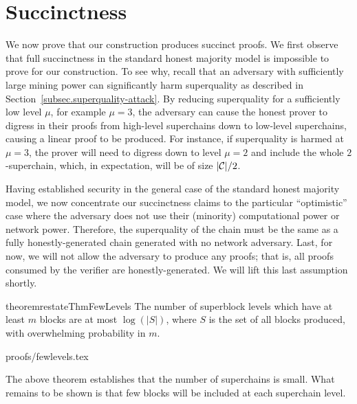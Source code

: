 \section{Succinctness}
\label{sec.succinctness}

We now prove that our construction produces succinct proofs.
%
We first observe that full succinctness in the standard honest majority model is
impossible to prove for our construction. To see why, recall that an adversary
with sufficiently large mining power can significantly harm superquality as
described in %
Section~\ref{subsec.superquality-attack}. By reducing
 superquality for a sufficiently low level $\mu$, for example $\mu = 3$, the
adversary can cause the honest prover to digress in their proofs from high-level
superchains down to low-level superchains, causing a linear proof to be
produced.
For instance, if superquality is harmed at $\mu = 3$, the prover will
need to digress down to level $\mu = 2$ and include the whole $2$-superchain,
which, in expectation, will be of size $|\mathcal{C}|/2$.

Having established security in the general case of the standard honest majority
model, we now concentrate our succinctness claims to the particular
``optimistic'' case where the adversary does not use their (minority)
computational power or network power. Therefore, the superquality of the chain
must be the same as a fully honestly-generated chain generated with no network
adversary. Last, for now, we will not allow the adversary to produce any proofs;
that is, all proofs consumed by the verifier are honestly-generated. We will
lift this last assumption shortly.

\begin{restatable}{theorem}{restateThmFewLevels}
    \label{thm.few-levels}
    The number of superblock levels which have at least $m$ blocks are at most
    $\log(|S|)$, where $S$ is the set of all blocks produced, with overwhelming
    probability in $m$.
\end{restatable}

{proofs/fewlevels.tex}

The above theorem establishes that the number of superchains is small. What
remains to be shown is that few blocks will be included at each superchain
level.

